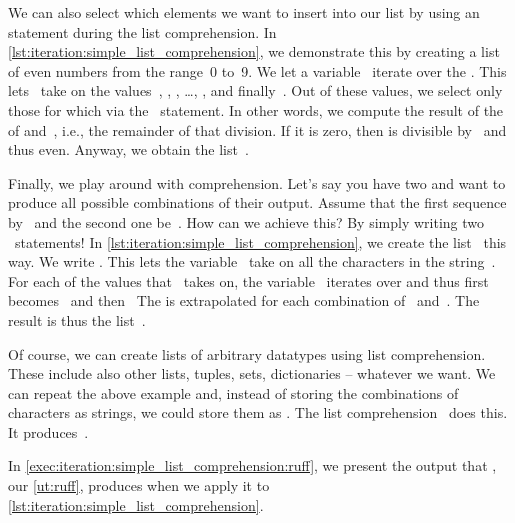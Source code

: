 We can also select which elements we want to insert into our list by using an  statement during the list comprehension.
In \cref{lst:iteration:simple_list_comprehension}, we demonstrate this by creating a list of even numbers from the range~0 to~9.
We let a variable~ iterate over the .
This lets~ take on the values~, , , \dots, , and finally~.
Out of these values, we select only those for which  via the ~statement.
In other words, we compute the result of the  of  and~, i.e., the remainder of that division.
If it is zero, then  is divisible by~ and thus even.
Anyway, we obtain the list~\pythonil{[0, 2, 4, 6, 8]}.%
%
\begin{sloppypar}%
Finally, we play around with  comprehension.
Let's say you have two  and want to produce all possible combinations of their output.
Assume that the first sequence by~ and the second one be~.
How can we achieve this?
By simply writing two ~statements!
In \cref{lst:iteration:simple_list_comprehension}, we create the list~ this way.
We write .
This lets the variable~ take on all the characters in the string~.
For each of the values that~ takes on, the variable~ iterates over  and thus first becomes~ and then~
The   is extrapolated for each combination of~ and~.
The result is thus the list~\pythonil{["ax", "ay", "bx", "by", "cx", "cy"]}.%
\end{sloppypar}%
%
\begin{sloppypar}%
Of course, we can create lists of arbitrary datatypes using list comprehension.
These include also other lists, tuples, sets, dictionaries -- whatever we want.
We can repeat the above example and, instead of storing the combinations of characters as strings, we could store them as .
The list comprehension~ does this.
It produces~\pythonil{[('a', 'x'), ('a', 'y'), ('b', 'x'), ('b', 'y'), ('c', 'x'), ('c', 'y')]}.
\end{sloppypar}%
%
In \cref{exec:iteration:simple_list_comprehension:ruff}, we present the output that \ruff, our \cref{ut:ruff}, produces when we apply it to \cref{lst:iteration:simple_list_comprehension}.
